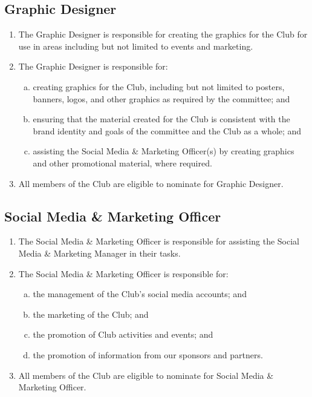 \documentclass{schedule}
\begin{document}
\subsection{Graphic Designer}
\begin{enumerate}[(1)]
    \item The Graphic Designer is responsible for creating the graphics for the Club for use in areas including but not limited to events and marketing.
    \item The Graphic Designer is responsible for:
          \begin{enumerate}[(a)]
              \item creating graphics for the Club, including but not limited to posters, banners, logos, and other graphics as required by the committee; and
              \item ensuring that the material created for the Club is consistent with the brand identity and goals of the committee and the Club as a whole; and
              \item assisting the Social Media \& Marketing Officer(s) by creating graphics and other promotional material, where required.
          \end{enumerate}
    \item All members of the Club are eligible to nominate for Graphic Designer.
\end{enumerate}

\subsection{Social Media \& Marketing Officer}\label{socialMediaOfficer}
\begin{enumerate}[(1)]
    \item The Social Media \& Marketing Officer is responsible for assisting the Social Media \& Marketing Manager in their tasks.
    \item The Social Media \& Marketing Officer is responsible for:
          \begin{enumerate}[(a)]
              \item the management of the Club's social media accounts; and
              \item the marketing of the Club; and
              \item the promotion of Club activities and events; and
              \item the promotion of information from our sponsors and partners.
          \end{enumerate}
    \item All members of the Club are eligible to nominate for Social Media \& Marketing Officer.
\end{enumerate}
\end{document}
